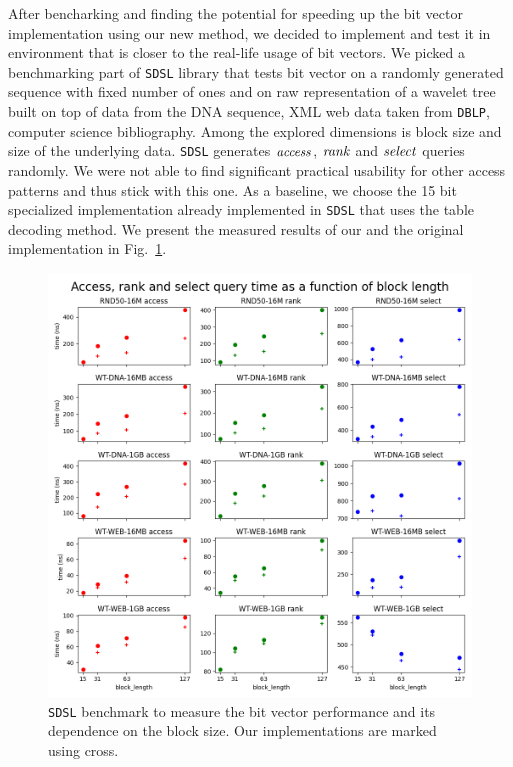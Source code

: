 After bencharking and finding the potential for speeding up the bit vector implementation using
our new method, we decided to implement and test it in environment that is closer to the real-life
usage of bit vectors. We picked a benchmarking part of \texttt{SDSL} library that tests bit vector
on a randomly generated sequence with fixed number of ones and on raw representation of a wavelet
tree built on top of data from the DNA sequence, XML web data taken from \texttt{DBLP}, computer
science bibliography. Among the explored dimensions is block size and size of the underlying data.
\texttt{SDSL} generates $\mathit{access}$, $\mathit{rank}$ and $\mathit{select}$ queries randomly. We were not able
to find significant practical usability for other access patterns and thus stick with this one.
As a baseline, we choose the 15 bit specialized implementation already implemented in \texttt{SDSL}
that uses the table decoding method. We present the measured results of our and the original
implementation in Fig.~\ref{obr:benchmark_sdsl_new_method}.
\begin{figure}
	\centerline{
		\includegraphics[width=\textwidth, height=0.7\textheight]{images/benchmark_sdsl_new_method}
	}
	\caption[TODO]{\texttt{SDSL} benchmark to measure the bit vector performance and its dependence
	on the block size. Our implementations are marked using cross.
	}
	\label{obr:benchmark_sdsl_new_method}
\end{figure}

